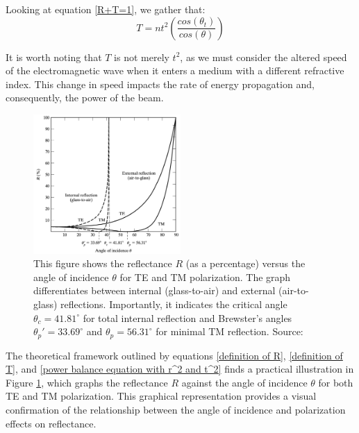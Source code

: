 Looking at equation \ref{R+T=1}, we gather that:
\begin{equation} \label{definition of T}
T =  n t^2 \left(\frac{cos(\theta_t)}{cos(\theta)} \right)
\end{equation}

It is worth noting that $T$ is not merely $t^2$, as we must consider the altered speed of the electromagnetic wave when it enters a medium with a different refractive index. This change in speed impacts the rate of energy propagation and, consequently, the power of the beam.

\begin{figure}[H]
  \centering
  \includegraphics[width=0.5\textwidth]{Chapters/Figures/Chapter 2 Figures/Reflectance vs Angle of Incidence.jpg}
  \caption[Reflectance vs Angle of Incidence]{This figure shows the reflectance $R$ (as a percentage) versus the angle of incidence $\theta$ for TE and TM polarization. The graph differentiates between internal (glass-to-air) and external (air-to-glass) reflections. Importantly, it indicates the critical angle $\theta_c = 41.81^\circ$ for total internal reflection and Brewster's angles $\theta_p' = 33.69^\circ$ and $\theta_p = 56.31^\circ$ for minimal TM reflection. Source: \cite{pedrotti_introduction_2007}}
  \label{fig: R vs Theta}
\end{figure}

The theoretical framework outlined by equations \ref{definition of R}, \ref{definition of T}, and \ref{power balance equation with r^2 and t^2} finds a practical illustration in Figure \ref{fig: R vs Theta}, which graphs the reflectance $R$ against the angle of incidence $\theta$ for both TE and TM polarization. This graphical representation provides a visual confirmation of the relationship between the angle of incidence and polarization effects on reflectance.

